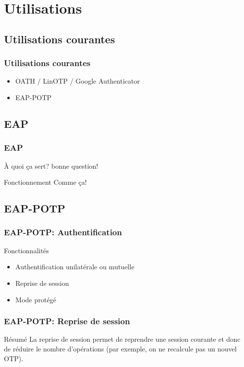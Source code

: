 \documentclass{beamer}
\begin{document}
\section{Utilisations}
\subsection{Utilisations courantes}
\begin{frame}
\frametitle{Utilisations courantes}
\begin{itemize}
 \item OATH / LinOTP / Google Authenticator
 \item EAP-POTP
\end{itemize}
\end{frame}


\subsection{EAP}
  \begin{frame}
  \frametitle{EAP}
    \begin{block}{À quoi ça sert?}
    bonne question!
    \end{block}
	\begin{block}{Fonctionnement}
	Comme ça!
	\end{block}
  \end{frame}
  
\subsection{EAP-POTP}
\begin{frame}
\frametitle{EAP-POTP: Authentification}
\begin{block}{Fonctionnalités}
\begin{itemize}
\item Authentification unilatérale ou mutuelle
\item Reprise de session
\item Mode protégé

\end{itemize}
\end{block}
\end{frame}

\begin{frame}
\frametitle{EAP-POTP: Reprise de session}
\begin{block}{Résumé}
La reprise de session permet de reprendre une session courante et donc de réduire le nombre d'opérations (par exemple, on ne recalcule pas un nouvel OTP).
\end{block}

\end{frame}
\end{document}
